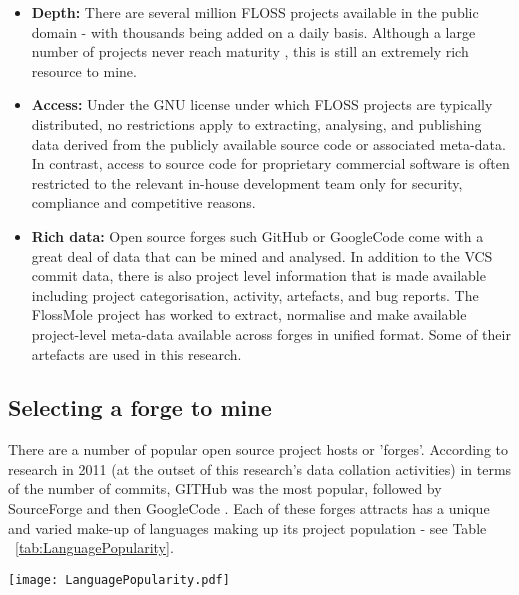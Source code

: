 \begin{itemize}
\item \textbf{Depth:} There are several million FLOSS projects available in the public domain - with thousands being added on a daily basis. Although a large number of projects never reach maturity \citep{comino2005planning}, this is still an extremely rich resource to mine\citep{deshpande2008total}.
\item \textbf{Access:} Under the GNU \citep{license2007version} license under which FLOSS projects are typically distributed, no restrictions apply to extracting, analysing, and publishing data derived from the publicly available source code or associated meta-data. In contrast, access to source code for proprietary commercial software is often restricted to the relevant in-house development team only for security, compliance and competitive reasons.
\item \textbf{Rich data:} Open source forges such GitHub \citep{github} or GoogleCode \citep{googlecode} come with a great deal of data that can be mined and analysed. In addition to the VCS commit data, there is also project level information that is made available including project categorisation, activity, artefacts, and bug reports. The FlossMole project \citep{howison2009flossmole} has worked to extract, normalise and make available project-level meta-data available across forges in unified format. Some of their artefacts are used in this research.
\end{itemize}

\subsection{Selecting a forge to mine}
There are a number of popular open source project hosts or 'forges'. According to research in 2011 (at the outset of this research's data collation activities) in terms of the number of commits, GITHub was the most popular, followed by SourceForge and then GoogleCode \citep{grady2011what}. Each of these forges attracts has a unique and varied make-up of languages making up its project population - see Table ~\ref{tab:LanguagePopularity}.

\begin{table}
\centering 
{}
\begin{tabular}
 \centering 
 \texttt{[image: LanguagePopularity.pdf]}
 \label{tab:LanguagePopularity}
\end{tabular}
\end{table}


